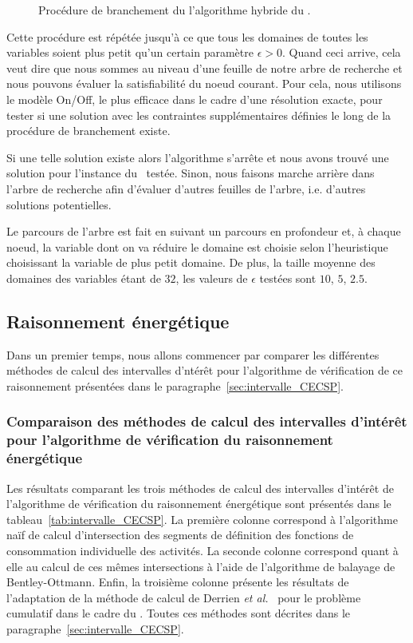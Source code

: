 \begin{figure}[!htb] 
  
  \caption{Procédure de branchement du l'algorithme hybride du \CECSP.}
  \label{fig:branching}
\end{figure}

Cette procédure est répétée jusqu'à ce que tous les domaines de toutes
les variables soient plus petit qu'un certain paramètre $\epsilon
>0$. Quand ceci arrive, cela veut dire que nous sommes au niveau d'une
feuille de notre arbre de recherche et nous pouvons évaluer la
satisfiabilité du noeud courant. Pour cela, nous utilisons le modèle
On/Off, le plus efficace dans le cadre d'une résolution exacte, pour
tester si une solution avec les contraintes supplémentaires définies
le long de la procédure de branchement existe.

Si une telle solution existe alors l'algorithme s'arrête et nous avons
trouvé une solution pour l'instance du \CECSP~testée. Sinon, nous
faisons marche arrière dans l'arbre de recherche afin d'évaluer
d'autres feuilles de l'arbre, i.e. d'autres solutions potentielles. 

Le parcours de l'arbre est fait en suivant un parcours en profondeur
et, à chaque noeud, la variable dont on va réduire le domaine est
choisie selon l'heuristique choisissant la variable de plus petit
domaine.  De plus, la taille moyenne des domaines des variables étant
de $32$, les valeurs de $\epsilon$ testées sont $10$, $5$, $2.5$.

\subsection{Raisonnement énergétique}
\label{sec:expe_RE}

Dans un premier temps, nous allons commencer par comparer les
différentes méthodes de calcul des intervalles d'ntérêt pour
l'algorithme de vérification de ce raisonnement présentées dans le
paragraphe~\ref{sec:intervalle_CECSP}. 

\subsubsection{Comparaison des méthodes de calcul des intervalles
  d'intérêt pour l'algorithme de vérification du raisonnement
  énergétique}

Les résultats comparant les trois méthodes de calcul des intervalles
d'intérêt de l'algorithme de vérification du raisonnement énergétique
sont présentés dans le tableau~\ref{tab:intervalle_CECSP}. La première
colonne correspond à l'algorithme naïf de calcul d'intersection des
segments de définition des fonctions de consommation individuelle des
activités. La seconde colonne correspond quant à elle au calcul de ces
mêmes intersections à l'aide de l'algorithme de balayage de
Bentley-Ottmann. Enfin, la troisième colonne présente les résultats de
l'adaptation de la méthode de calcul de Derrien {\it et al.}~\cite{DP}
pour le problème cumulatif dans le cadre du \CECSP. Toutes ces
méthodes sont décrites dans le
paragraphe~\ref{sec:intervalle_CECSP}.

